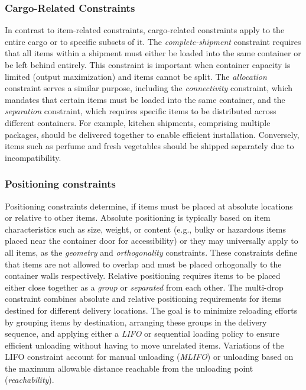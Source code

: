 

\subsubsection{Cargo-Related Constraints}
In contrast to item-related constraints, cargo-related constraints apply to
the entire cargo or to specific subsets of it. The \textit{complete-shipment} constraint
requires that all items within a shipment must either be loaded into the same
container or be left behind entirely. This constraint is important
when container capacity is limited (output maximization) and items
cannot be split. The \textit{allocation} constraint serves a similar purpose,
including the \textit{connectivity} constraint, which mandates that
certain items must be loaded into the same container, and the
\textit{separation} constraint, which requires specific items to
be distributed across different containers. For example, kitchen
shipments, comprising multiple packages, should be delivered together
to enable efficient installation. Conversely, items such as perfume and fresh
vegetables should be shipped separately due to incompatibility.

\subsubsection{Positioning constraints}

Positioning constraints determine, if items must be placed at
absolute locations or relative to other items. Absolute positioning is
typically based on item characteristics such as size, weight, or
content (e.g., bulky or hazardous items placed near the container door for accessibility) or
they may universally apply to all items, as the \textit{geometry} and
\textit{orthogonality} constraints. These constraints define that items are not allowed to overlap
and must be placed orhogonally to the container walls respectively.
Relative positioning requires items to be placed either close together as a \textit{group} or
\textit{separated} from each other.
The multi-drop constraint combines absolute and relative positioning requirements for items
destined for different delivery locations. The goal is to minimize reloading efforts by grouping items
by destination, arranging these groups in the delivery sequence, and applying either a \textit{\gls{LIFO}}
or sequential loading policy to ensure efficient unloading without having to move unrelated items.
Variations of the \gls{LIFO} constraint account for manual unloading (\textit{\gls{MLIFO}}) or unloading based on the
maximum allowable distance reachable from the unloading point (\textit{reachability}).


